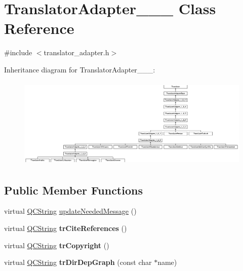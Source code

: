 \hypertarget{class_translator_adapter__1__7__5}{}\section{Translator\+Adapter\+\_\+\_\+\_ Class Reference}
\label{class_translator_adapter__1__7__5}


{\ttfamily \#include $<$translator\+\_\+adapter.\+h$>$}

Inheritance diagram for Translator\+Adapter\+\_\+\_\+\_\+:\begin{figure}[H]
\begin{center}
\leavevmode
\includegraphics[height=4.366472cm]{class_translator_adapter__1__7__5}
\end{center}
\end{figure}
\subsection*{Public Member Functions}
\begin{DoxyCompactItemize}
\item 
virtual \mbox{\hyperlink{class_q_c_string}{Q\+C\+String}} \mbox{\hyperlink{class_translator_adapter__1__7__5_a6e69d48e79a13c9d934f9af1a8befd8a}{update\+Needed\+Message}} ()
\item 
\mbox{\label{class_translator_adapter__1__7__5_ab4ade1617a97ef1340201d5e551c355b}} 
virtual \mbox{\hyperlink{class_q_c_string}{Q\+C\+String}} {\bfseries tr\+Cite\+References} ()
\item 
\mbox{\label{class_translator_adapter__1__7__5_ae43b0f966bbfa1ee7fafcc2bd4d22b22}} 
virtual \mbox{\hyperlink{class_q_c_string}{Q\+C\+String}} {\bfseries tr\+Copyright} ()
\item 
\mbox{\label{class_translator_adapter__1__7__5_a3bf65b69eeddae154b563b0d7a373232}} 
virtual \mbox{\hyperlink{class_q_c_string}{Q\+C\+String}} {\bfseries tr\+Dir\+Dep\+Graph} (const char $\ast$name)
\end{DoxyCompactItemize}
